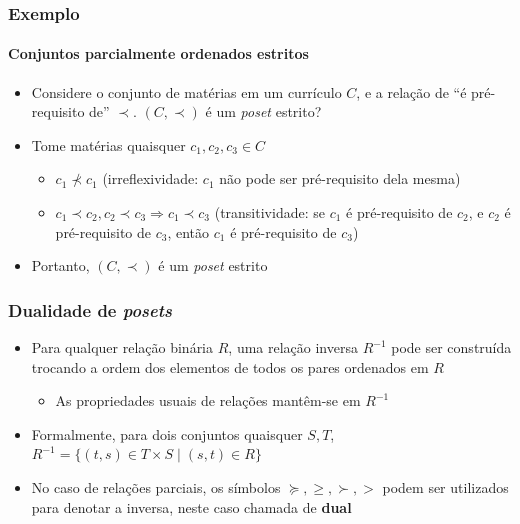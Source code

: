 \documentclass[12pt]{beamer}
\begin{document}
\begin{frame}
  \frametitle{Exemplo}
  \framesubtitle{Conjuntos parcialmente ordenados estritos}
  \begin{itemize}
    \item<1-> Considere o conjunto de matérias em um currículo $C$, e a relação
        de ``é pré-requisito de'' $\prec$. $(C, \prec)$ é um \emph{poset}
          estrito?
    \item<2-> Tome matérias quaisquer $c_1, c_2, c_3 \in C$
    \begin{itemize}[itemsep=0pt]
      \item<3-> $c_1 \not\prec c_1$ (irreflexividade: $c_1$ não pode ser
          pré-requisito dela mesma)
      \item<4-> $c_1 \prec c_2, c_2 \prec c_3 \Rightarrow c_1 \prec c_3$
          (transitividade: se $c_1$ é pré-requisito de $c_2$, e $c_2$ é
            pré-requisito de $c_3$, então $c_1$ é pré-requisito de $c_3$)
    \end{itemize}
    \item<5-> Portanto, $(C, \prec)$ é um \emph{poset} estrito
  \end{itemize}
\end{frame}

\begin{frame}
  \frametitle{Dualidade de \emph{posets}}
  \begin{itemize}
    \item Para qualquer relação binária $R$, uma relação inversa $R^{-1}$ pode
        ser construída trocando a ordem dos elementos de todos os pares
          ordenados em $R$
    \begin{itemize}
      \item As propriedades usuais de relações mantêm-se em $R^{-1}$
    \end{itemize}
    \item Formalmente, para dois conjuntos quaisquer $S, T$, $R^{-1} = \{(t, s)
        \in T \times S \mid (s, t) \in R\}$
    \item No caso de relações parciais, os símbolos $\succcurlyeq, \geq, \succ,
        >$ podem ser utilizados para denotar a inversa, neste caso chamada de
          \textbf{dual}
  \end{itemize}
\end{frame}
\end{document}
